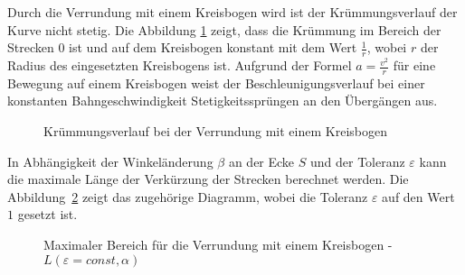 Durch die Verrundung mit einem Kreisbogen wird ist der Krümmungsverlauf der Kurve nicht stetig. Die Abbildung \ref{KreisstrategieKruemmung} zeigt, dass die Krümmung im Bereich der Strecken $0$ ist und auf dem Kreisbogen konstant mit dem Wert $\frac{1}{r}$, wobei $r$ der Radius des eingesetzten Kreisbogens ist. Aufgrund der Formel $a=\frac{v^2}{r}$ für eine Bewegung auf einem Kreisbogen weist der Beschleunigungsverlauf bei einer konstanten Bahngeschwindigkeit Stetigkeitssprüngen an  den Übergängen aus.


\begin{figure}
  \begin{center}
  \end{center}
  \caption{Krümmungsverlauf bei der Verrundung mit einem Kreisbogen}\label{KreisstrategieKruemmung}
\end{figure}



\bigskip




In Abhängigkeit der Winkeländerung $\beta$ an der Ecke $S$ und der Toleranz $\varepsilon$ kann die maximale Länge der Verkürzung der Strecken berechnet werden. Die Abbildung~\ref{KreisstrategieL} zeigt das zugehörige Diagramm, wobei die Toleranz $\varepsilon$ auf den Wert $1$ gesetzt ist.
 
 
\begin{figure}
  \begin{center}
  \end{center}
  \caption{Maximaler Bereich für die Verrundung mit einem Kreisbogen - $L(\varepsilon=const, \alpha)$}\label{KreisstrategieL}
\end{figure}


